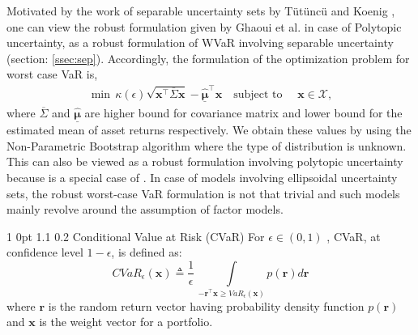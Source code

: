 \documentclass[12pt]{article}
\makeatletter
\numberwithin{equation}{section}
\renewcommand{\subsection}{
  \@startsection
  {subsection}%
  {1}%
  {0pt}%
  {1.1\baselineskip}%
  {0.2\baselineskip}%
  {\sc \centering}%
}
\makeatother
\begin{document}
Motivated by the work of separable uncertainty sets by T{\"u}t{\"u}nc{\"u} and Koenig \cite{tutuncu}, one can view the robust formulation given by Ghaoui et al. \cite{ghaoui03} in case of Polytopic uncertainty, as a robust formulation of WVaR involving separable uncertainty (section: \ref{ssec:sep}). Accordingly, the formulation of the optimization problem for worst case VaR is,
\begin{equation}
\begin{split}
\min \, \kappa(\epsilon)\sqrt{\mathbf{x}^{\top}\overline{\Sigma}\mathbf{x}} - \underline{\hat{\boldsymbol{\mu}}}^{\top}\mathbf{x} \quad \text{subject to } \quad \mathbf{x} \in \mathcal{X},
\end{split}
\label{fig:var_poly}
\end{equation}
where $\overline{\Sigma}$ and $\underline{\hat{\boldsymbol{\mu}}}$ are higher bound for covariance matrix and lower bound for the estimated mean of asset returns respectively. We obtain these values by using the Non-Parametric Bootstrap algorithm where the type of distribution is unknown. This can also be viewed as a robust formulation involving polytopic uncertainty because  is a special case of . In case of models involving ellipsoidal uncertainty sets, the robust worst-case VaR formulation is not that trivial and such models mainly revolve around the assumption of factor models.

\subsection {Conditional Value at Risk (CVaR)}
For $\epsilon \in (0,1)$ , CVaR, at confidence level $1-\epsilon$, is defined as:
\begin{equation}
\label{eq:6.1}
CVaR_{\epsilon}(\mathbf{x}) \triangleq \frac{1}{\epsilon} \, \int \limits_{-\mathbf{r}^{\top}\mathbf{x} \geq VaR_{\epsilon}(\mathbf{x})} p(\mathbf{r})  d\mathbf{r}
\end{equation}
where $\mathbf{r}$ is the random return vector having probability density function $p(\mathbf{r})$ and $\mathbf{x}$ is the weight vector for a portfolio.
\end{document}
